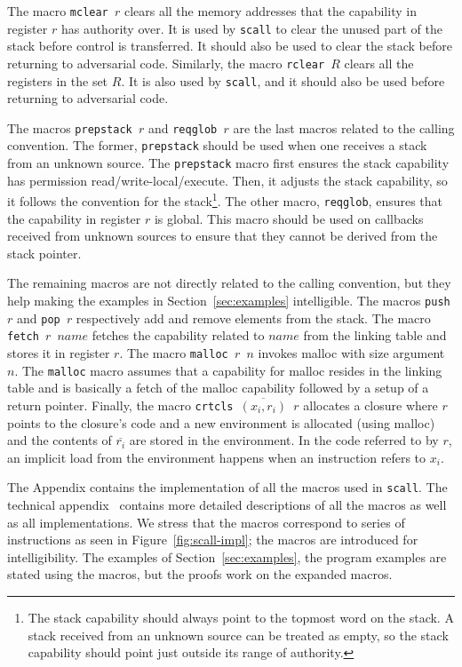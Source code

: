 \documentclass[format=acmsmall, review=true, screen=true]{acmart}
\renewcommand{\figurename}{Figure}
\renewcommand{\sectionname}{Section}
\newcommand{\var}[1]{\mathit{#1}}
\newenvironment{toplas}{}{}
\newcommand{\itoplassug}[1]{}
\begin{document}
\begin{toplas}
The macro \texttt{mclear $r$} clears all the memory addresses that the
capability in register $r$ has authority over. It is used by \texttt{scall} to
clear the unused part of the stack before control is transferred. It should also
be used to clear the stack before returning to adversarial code. Similarly, the
macro \texttt{rclear $R$} clears all the registers in the set
$R$. It is also used by \texttt{scall}, and it should also be used before
returning to adversarial code.

The macros \texttt{prepstack $r$} and \texttt{reqglob
    $r$} are the last macros related to the calling convention. The former,
\texttt{prepstack} should be used when one receives a stack from an unknown
source. The \texttt{prepstack} macro first ensures the stack capability has permission
read/write-local/execute. Then, it adjusts the stack capability, so it
follows the convention for the stack\footnote{The stack capability should always
point to the topmost word on the stack. A stack received from an unknown source
can be treated as empty, so the stack capability should point just outside its
range of authority.}. The other macro, \texttt{reqglob}, ensures that the
capability in register $r$ is global. This macro should be used on callbacks
received from unknown sources to ensure that they cannot be derived from the
stack pointer.

The remaining macros are not directly related to the calling convention, but
they help making the examples in \sectionname~\ref{sec:examples} intelligible.
The macros \texttt{push $r$} and \texttt{pop $r$} respectively add and remove
elements from the stack. The macro \texttt{fetch $r$ $\var{name}$} fetches the
capability related to $\var{name}$ from the linking table and stores it in
register $r$. The macro \texttt{malloc $r$ $n$} invokes malloc with size
argument $n$. The \texttt{malloc} macro assumes that a capability for malloc
resides in the linking table and is basically a fetch of the malloc capability
followed by a setup of a return pointer. Finally, the macro \texttt{crtcls
  $\overline{(x_i,r_i)}$ $r$} allocates a closure where $r$ points to the
closure's code and a new environment is allocated (using malloc) and the
contents of $\overline{r_i}$ are stored in the environment. In the code referred
to by $r$, an implicit load from the environment happens when an instruction
refers to $x_i$.

The Appendix contains the implementation of all the macros used in
\texttt{scall}. The technical appendix~\citep{technical_appendix} contains more
detailed descriptions of all the macros as well as all implementations.
We stress that the macros correspond to series of instructions as seen in
\figurename~\ref{fig:scall-impl}; the macros
are introduced for intelligibility. The examples of
\sectionname~\ref{sec:examples}, the program examples are stated using the
macros, but the proofs work on the expanded macros.
\end{toplas}
\end{document}
